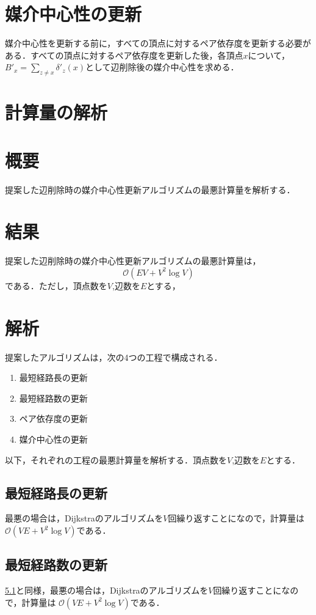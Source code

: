 \section{媒介中心性の更新}
媒介中心性を更新する前に，すべての頂点に対するペア依存度を更新する必要がある．すべての頂点に対するペア依存度を更新した後，各頂点$x$について，$B'_x=\sum_{z\neq x}\delta'_{z}(x)$として辺削除後の媒介中心性を求める．

\section{計算量の解析}
\section{概要}

提案した辺削除時の媒介中心性更新アルゴリズムの最悪計算量を解析する．

\section{結果}
提案した辺削除時の媒介中心性更新アルゴリズムの最悪計算量は，
\[ \mathcal{O}(EV+V^2\log V) \]
である．ただし，頂点数を$V$,辺数を$E$とする，

\section{解析}

提案したアルゴリズムは，次の4つの工程で構成される．

\begin{enumerate}
\item 最短経路長の更新
\item 最短経路数の更新
\item ペア依存度の更新
\item 媒介中心性の更新
\end{enumerate}

以下，それぞれの工程の最悪計算量を解析する．頂点数を$V$,辺数を$E$とする．

\subsection{最短経路長の更新}
\label{subsect:phase1}
最悪の場合は，Dijkstraのアルゴリズムを$V$回繰り返すことになので，計算量は
$\mathcal{O}(VE+V^2\log V)$である．

\subsection{最短経路数の更新}
\label{subsect:phase2}
\ref{subsect:phase1}と同様，最悪の場合は，Dijkstraのアルゴリズムを$V$回繰り返すことになので，計算量は
$\mathcal{O}(VE+V^2\log V)$である．

